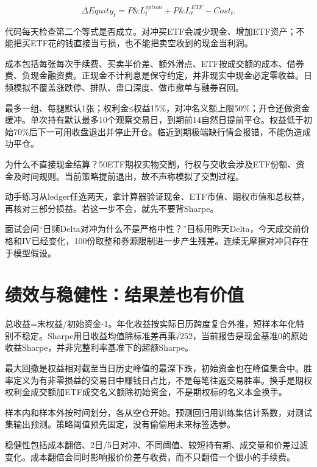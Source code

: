 \documentclass[UTF8,11pt,a4paper]{ctexart}
\begin{document}
\[
\Delta Equity_t=P\&L^{option}_t+P\&L^{ETF}_t-Cost_t.
\]

代码每天检查第二个等式是否成立。对冲买ETF会减少现金、增加ETF资产；不能把买ETF花的钱直接当亏损，也不能把卖空收到的现金当利润。

成本包括每张每次手续费、买卖半价差、额外滑点、ETF按成交额的成本、借券费、负现金融资费。正现金不计利息是保守约定，并非现实中现金必定零收益。日频模拟不覆盖涨跌停、排队、盘口深度、做市撤单与融券召回。

最多一组、每腿默认1张；权利金≤权益15\%，对冲名义额上限50\%；开仓还做资金缓冲。单次持有默认最多10个观察交易日，到期前14自然日提前平仓。权益低于初始70\%后下一可用收盘退出并停止开仓。临近到期极端缺行情会报错，不能伪造成功平仓。

为什么不直接现金结算？50ETF期权实物交割，行权与交收会涉及ETF份额、资金及时间规则。当前策略提前退出，故不声称模拟了交割过程。

\begin{learningbox}{动手练习}从ledger任选两天，拿计算器验证现金、ETF市值、期权市值和总权益，再核对三部分损益。若这一步不会，就先不要背Sharpe。\end{learningbox}

\begin{learningbox}{面试会问}“日频Delta对冲为什么不是严格中性？”目标用昨天Delta，今天成交前价格和IV已经变化，100份取整和券源限制进一步产生残差。连续无摩擦对冲只存在于模型假设。\end{learningbox}


\section{绩效与稳健性：结果差也有价值}

总收益=末权益/初始资金-1。年化收益按实际日历跨度复合外推，短样本年化特别不稳定。Sharpe用日收益均值除标准差再乘√252，当前报告是现金基准0的原始收益Sharpe，并非完整利率基准下的超额Sharpe。

最大回撤是权益相对截至当日历史峰值的最深下跌，初始资金也在峰值集合中。胜率定义为有非零损益的交易日中赚钱日占比，不是每笔往返交易胜率。换手是期权权利金成交额加ETF成交名义额除初始资金，不是期权标的名义本金换手。

样本内和样本外按时间划分，各从空仓开始。预测回归用训练集估计系数，对测试集输出预测。策略阈值预先固定，没有偷偷用未来标签选参。

稳健性包括成本翻倍、2日/5日对冲、不同阈值、较短持有期、成交量和价差过滤变化。成本翻倍会同时影响报价价差与收费，而不只翻倍一个很小的手续费。
\end{document}
